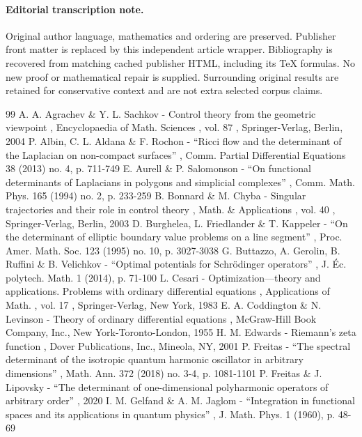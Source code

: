 \documentclass[11pt]{article}
\begin{document}
\paragraph{Editorial transcription note.}
Original author language, mathematics and ordering are preserved. Publisher front matter is replaced by this independent article wrapper. Bibliography is recovered from matching cached publisher HTML, including its TeX formulas. No new proof or mathematical repair is supplied. Surrounding original results are retained for conservative context and are not extra selected corpus claims.
\clearpage

\begin{thebibliography}{99}
 A. A. Agrachev \& Y. L. Sachkov - Control theory from the geometric viewpoint , Encyclopaedia of Math. Sciences , vol. 87 , Springer-Verlag, Berlin, 2004
 P. Albin, C. L. Aldana \& F. Rochon - “Ricci flow and the determinant of the Laplacian on non-compact surfaces” , Comm. Partial Differential Equations 38 (2013) no. 4, p. 711-749
 E. Aurell \& P. Salomonson - “On functional determinants of Laplacians in polygons and simplicial complexes” , Comm. Math. Phys. 165 (1994) no. 2, p. 233-259
 B. Bonnard \& M. Chyba - Singular trajectories and their role in control theory , Math. \& Applications , vol. 40 , Springer-Verlag, Berlin, 2003
 D. Burghelea, L. Friedlander \& T. Kappeler - “On the determinant of elliptic boundary value problems on a line segment” , Proc. Amer. Math. Soc. 123 (1995) no. 10, p. 3027-3038
 G. Buttazzo, A. Gerolin, B. Ruffini \& B. Velichkov - “Optimal potentials for Schrödinger operators” , J. Éc. polytech. Math. 1 (2014), p. 71-100
 L. Cesari - Optimization—theory and applications. Problems with ordinary differential equations , Applications of Math. , vol. 17 , Springer-Verlag, New York, 1983
 E. A. Coddington \& N. Levinson - Theory of ordinary differential equations , McGraw-Hill Book Company, Inc., New York-Toronto-London, 1955
 H. M. Edwards - Riemann’s zeta function , Dover Publications, Inc., Mineola, NY, 2001
 P. Freitas - “The spectral determinant of the isotropic quantum harmonic oscillator in arbitrary dimensions” , Math. Ann. 372 (2018) no. 3-4, p. 1081-1101
 P. Freitas \& J. Lipovsky - “The determinant of one-dimensional polyharmonic operators of arbitrary order” , 2020
 I. M. Gelfand \& A. M. Jaglom - “Integration in functional spaces and its applications in quantum physics” , J. Math. Phys. 1 (1960), p. 48-69

\end{thebibliography}
\end{document}
